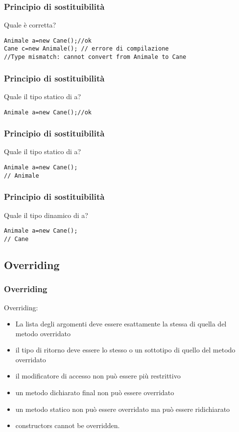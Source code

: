 \documentclass{beamer}
\begin{document}
\begin{frame}[fragile]
\frametitle{Principio di sostituibilit\`a}
Quale \`e corretta?
\begin{framed}
\begin{lstlisting}
Animale a=new Cane();//ok
Cane c=new Animale(); // errore di compilazione
//Type mismatch: cannot convert from Animale to Cane
\end{lstlisting}
\end{framed}
\end{frame}

\begin{frame}[fragile]
\frametitle{Principio di sostituibilit\`a}
Quale il tipo statico di a? 
\begin{framed}
\begin{lstlisting}
Animale a=new Cane();//ok
\end{lstlisting}
\end{framed}
\end{frame}

\begin{frame}[fragile]
\frametitle{Principio di sostituibilit\`a}
Quale il tipo statico di a? 
\begin{framed}
\begin{lstlisting}
Animale a=new Cane();
// Animale
\end{lstlisting}
\end{framed}
\end{frame}

\begin{frame}[fragile]
\frametitle{Principio di sostituibilit\`a}
Quale il tipo dinamico di a? 
\begin{framed}
\begin{lstlisting}
Animale a=new Cane();
// Cane
\end{lstlisting}
\end{framed}
\end{frame}


\subsection{Overriding}
\begin{frame}[fragile]
\frametitle{Overriding}
\begin{framed}
Overriding:
\begin{itemize}
\item La lista degli argomenti deve essere esattamente la stessa di quella del metodo overridato
\item il tipo di ritorno deve essere lo stesso o un sottotipo di quello del metodo overridato
\item il modificatore di accesso non pu\`o essere pi\`u restrittivo
\item un metodo dichiarato final non pu\`o essere overridato
\item un metodo statico non pu\`o essere overridato ma pu\`o essere ridichiarato
\item constructors cannot be overridden.
\end{itemize}
\end{framed}
\end{frame}
\end{document}
